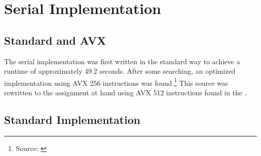 \documentclass{article}
\newcommand{\MYhref}[3][blue]{\href{#2}{\color{#1}{#3}}}%
\begin{document}
\section{Serial Implementation}
\subsection{Standard and AVX}
The serial implementation was first written in the standard way to achieve a runtime of approximately 
49.2 seconds. After some searching, an optimized implementation using AVX 256 instructions was found.\footnote{Source: \MYhref{https://polarnick.com/blogs/other/cpu/gpu/sse/opencl/openmp/2016/10/01/mandelbrot-set-sse-opencl.html}{https://polarnick.com/blogs/other/cpu/gpu/sse/opencl/openmp/2016/10/01/mandelbrot-set-sse-opencl.html}} 
This source was rewritten to the assignment at hand using AVX 512 instructions found in the \MYhref{https://www.intel.com/content/www/us/en/docs/intrinsics-guide/index.html}{intel intrinsics guide}. 

\subsection{Standard Implementation}
\end{document}
